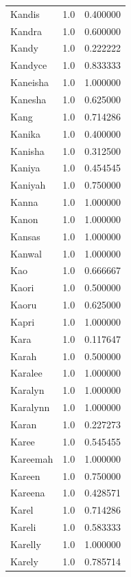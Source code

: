 \documentclass[
  letterpaper,
  DIV=11,
  numbers=noendperiod]{scrreprt}
\begin{document}
\begin{tabular}{lrr}
Kandis          &   1.0 &   0.400000 \\
Kandra          &   1.0 &   0.600000 \\
Kandy           &   1.0 &   0.222222 \\
Kandyce         &   1.0 &   0.833333 \\
Kaneisha        &   1.0 &   1.000000 \\
Kanesha         &   1.0 &   0.625000 \\
Kang            &   1.0 &   0.714286 \\
Kanika          &   1.0 &   0.400000 \\
Kanisha         &   1.0 &   0.312500 \\
Kaniya          &   1.0 &   0.454545 \\
Kaniyah         &   1.0 &   0.750000 \\
Kanna           &   1.0 &   1.000000 \\
Kanon           &   1.0 &   1.000000 \\
Kansas          &   1.0 &   1.000000 \\
Kanwal          &   1.0 &   1.000000 \\
Kao             &   1.0 &   0.666667 \\
Kaori           &   1.0 &   0.500000 \\
Kaoru           &   1.0 &   0.625000 \\
Kapri           &   1.0 &   1.000000 \\
Kara            &   1.0 &   0.117647 \\
Karah           &   1.0 &   0.500000 \\
Karalee         &   1.0 &   1.000000 \\
Karalyn         &   1.0 &   1.000000 \\
Karalynn        &   1.0 &   1.000000 \\
Karan           &   1.0 &   0.227273 \\
Karee           &   1.0 &   0.545455 \\
Kareemah        &   1.0 &   1.000000 \\
Kareen          &   1.0 &   0.750000 \\
Kareena         &   1.0 &   0.428571 \\
Karel           &   1.0 &   0.714286 \\
Kareli          &   1.0 &   0.583333 \\
Karelly         &   1.0 &   1.000000 \\
Karely          &   1.0 &   0.785714 \\

\end{tabular}
\end{document}
